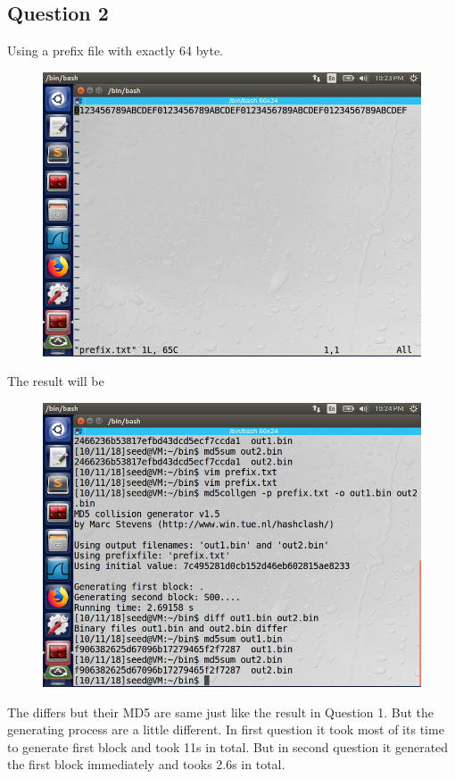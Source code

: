 \documentclass{article}
\begin{document}
\subsection{Question 2}
Using a prefix file with exactly 64 byte.
\begin{figure}[H]\centering\includegraphics[width=\textwidth]{ss/04.png}\end{figure}
The result will be
\begin{figure}[H]\centering\includegraphics[width=\textwidth]{ss/05.png}\end{figure}
The  differs  but their MD5 are same just like the result in Question 1. But the generating process are a little different. In first question it took most of its time to generate first block and took 11s in total. But in second question it generated the first block immediately and tooks 2.6s in total.
\end{document}
